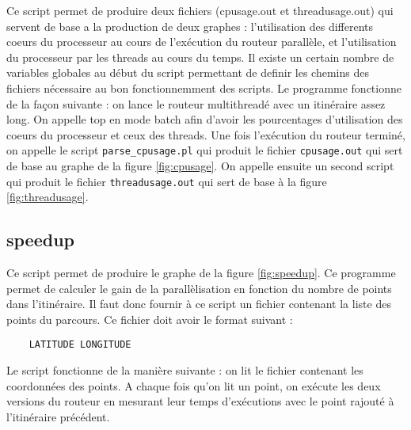 \begin{appendices}
  Ce script permet de produire deux fichiers (cpusage.out et threadusage.out)
  qui servent de base a la production de deux graphes : l'utilisation des 
  differents coeurs du processeur au cours de l'exécution du routeur parallèle, 
  et l'utilisation du processeur par les threads au cours du temps. Il existe un
  certain nombre de variables globales au début du script permettant de definir 
  les chemins des fichiers nécessaire au bon fonctionnemment des scripts. Le 
  programme fonctionne de la façon suivante : on lance le routeur multithreadé 
  avec un itinéraire assez long. On appelle top en mode batch afin d'avoir les 
  pourcentages d'utilisation des coeurs du processeur et ceux des threads. 
  Une fois l'exécution du routeur terminé, on appelle le script 
  \texttt{parse\_cpusage.pl} qui produit le fichier \texttt{cpusage.out} qui 
  sert de base au graphe de la figure \ref{fig:cpusage}. On appelle ensuite 
  un second script qui produit le fichier \texttt{threadusage.out} qui sert de 
  base à la figure \ref{fig:threadusage}. 
  
  \subsection{speedup}
  \label{ann:speedup}

  Ce script permet de produire le graphe de la figure \ref{fig:speedup}. 
  Ce programme permet de calculer le gain de la parallèlisation en fonction
  du nombre de points dans l'itinéraire. Il faut donc fournir à ce script un 
  fichier contenant la liste des points du parcours. Ce fichier doit avoir le 
  format suivant :
  \begin{lstlisting}
    LATITUDE LONGITUDE
  \end{lstlisting}
  \vspace{1em}

  Le script fonctionne de la manière suivante : on lit le fichier contenant les 
  coordonnées des points. A chaque fois qu'on lit un point, on exécute les deux 
  versions du routeur en mesurant leur temps d'exécutions avec le point rajouté 
  à l'itinéraire précédent. 


\end{appendices}
